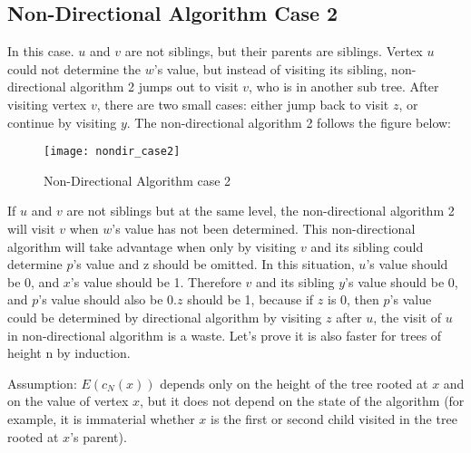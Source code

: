 \subsection{Non-Directional Algorithm Case 2}
   In this case. $u$ and $v$ are not siblings, but their parents are siblings. Vertex $u$ could not determine the $w$'s value, but instead of visiting its sibling, non-directional algorithm 2 jumps out to visit $v$, who is in another sub tree. After visiting vertex $v$, there are two small cases: either jump back to visit $z$, or continue by visiting $y$. The non-directional algorithm 2 follows the figure below:
   \begin{figure}[H]
   	\centering
   	\texttt{[image: nondir\_case2]}
   	\caption{Non-Directional Algorithm case 2}
   	\label{fig:nondircase2}
   \end{figure}

   If $u$ and $v$ are not siblings but at the same level, the non-directional algorithm 2 will visit $v$ when $w$'s value has not been determined. This non-directional algorithm will take advantage when only by visiting $v$ and its sibling could determine $p$'s value and z should be omitted. In this situation, $u$'s value should be 0, and $x$'s value should be 1. Therefore $v$ and its sibling $y$'s value should be 0, and $p$'s value should also be $0$.$z$ should be 1, because if $z$ is 0, then $p$'s value could be determined by directional algorithm by visiting $z$ after $u$, the visit of $u$ in non-directional algorithm is a waste. Let's prove it is also faster for trees of height n by induction. 
   
   Assumption: $E(c_N(x))$ depends only on the height of the tree rooted at $x$ and on the value of vertex $x$, but it does not depend on the state of the algorithm (for example, it is immaterial whether $x$ is the first or second child visited in the tree rooted at $x$'s parent). 
   
